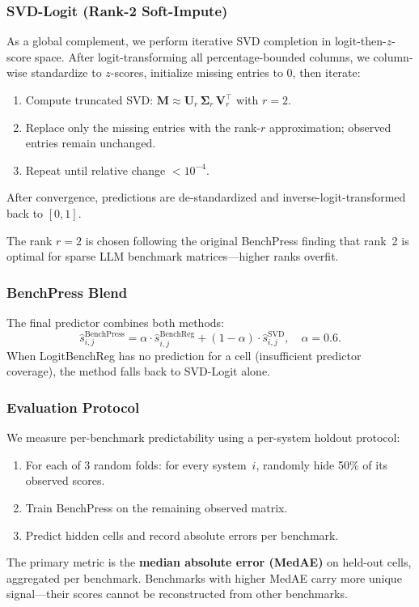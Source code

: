 \subsubsection{SVD-Logit (Rank-2 Soft-Impute)}
\label{app:svd-logit}

As a global complement, we perform iterative SVD completion in logit-then-$z$-score
space.  After logit-transforming all percentage-bounded columns, we column-wise
standardize to $z$-scores, initialize missing entries to 0, then iterate:
\begin{enumerate}
  \item Compute truncated SVD: $\mathbf{M} \approx \mathbf{U}_r\,\mathbf{\Sigma}_r\,\mathbf{V}_r^\top$ with $r{=}2$.
  \item Replace only the missing entries with the rank-$r$ approximation;
        observed entries remain unchanged.
  \item Repeat until relative change $< 10^{-4}$.
\end{enumerate}
After convergence, predictions are de-standardized and inverse-logit-transformed
back to $[0,1]$.

The rank $r{=}2$ is chosen following the original BenchPress finding that rank~2
is optimal for sparse LLM benchmark matrices---higher ranks overfit.

\subsubsection{BenchPress Blend}
\label{app:benchpress-blend}

The final predictor combines both methods:
\begin{equation}
  \hat{s}_{i,j}^{\mathrm{BenchPress}}
  = \alpha \cdot \hat{s}_{i,j}^{\mathrm{BenchReg}}
  + (1{-}\alpha) \cdot \hat{s}_{i,j}^{\mathrm{SVD}},
  \quad \alpha = 0.6.
  \label{eq:benchpress-blend}
\end{equation}
When LogitBenchReg has no prediction for a cell (insufficient predictor
coverage), the method falls back to SVD-Logit alone.

\subsubsection{Evaluation Protocol}
\label{app:benchpress-eval}

We measure per-benchmark predictability using a per-system holdout protocol:
\begin{enumerate}
  \item For each of 3 random folds: for every system~$i$, randomly hide 50\%
        of its observed scores.
  \item Train BenchPress on the remaining observed matrix.
  \item Predict hidden cells and record absolute errors per benchmark.
\end{enumerate}
The primary metric is the \textbf{median absolute error (MedAE)} on held-out
cells, aggregated per benchmark.  Benchmarks with higher MedAE carry more
unique signal---their scores cannot be reconstructed from other benchmarks.

